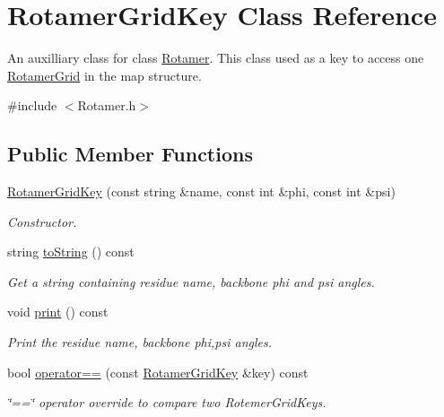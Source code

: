 \hypertarget{classRotamerGridKey}{\section{Rotamer\-Grid\-Key Class Reference}
\label{classRotamerGridKey}
}


An auxilliary class for class \hyperlink{classRotamer}{Rotamer}. This class used as a key to access one \hyperlink{classRotamerGrid}{Rotamer\-Grid} in the map structure.  




{\ttfamily \#include $<$Rotamer.\-h$>$}

\subsection*{Public Member Functions}
\begin{DoxyCompactItemize}
\item 
\hyperlink{classRotamerGridKey_aee87d6af570de7f03b485cbed293eb8d}{Rotamer\-Grid\-Key} (const string \&name, const int \&phi, const int \&psi)
\begin{DoxyCompactList}\small\item\em Constructor. \end{DoxyCompactList}\item 
string \hyperlink{classRotamerGridKey_ad88595feb7e0c7a4dbd0ac21936a4d11}{to\-String} () const 
\begin{DoxyCompactList}\small\item\em Get a string containing residue name, backbone phi and psi angles. \end{DoxyCompactList}\item 
\hypertarget{classRotamerGridKey_a3578afe99c7106457f0d89a71cb6ef17}{void \hyperlink{classRotamerGridKey_a3578afe99c7106457f0d89a71cb6ef17}{print} () const }\label{classRotamerGridKey_a3578afe99c7106457f0d89a71cb6ef17}

\begin{DoxyCompactList}\small\item\em Print the residue name, backbone phi,psi angles. \end{DoxyCompactList}\item 
bool \hyperlink{classRotamerGridKey_adf8cb8448cf8226bfa7272fcc4f2d1a6}{operator==} (const \hyperlink{classRotamerGridKey}{Rotamer\-Grid\-Key} \&key) const 
\begin{DoxyCompactList}\small\item\em \char`\"{}==\char`\"{} operator override to compare two Rotemer\-Grid\-Keys. \end{DoxyCompactList}\end{DoxyCompactItemize}

